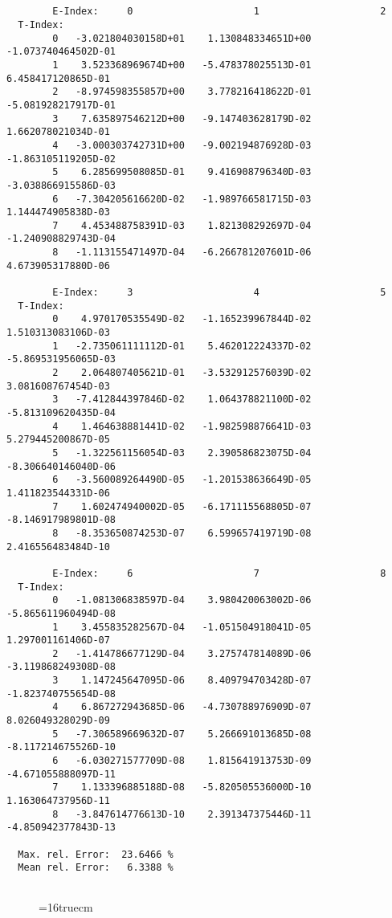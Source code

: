 \documentclass[12pt]{article}
\begin{document}
\begin{small}\begin{verbatim}


        E-Index:     0                     1                     2
  T-Index:
        0   -3.021804030158D+01    1.130848334651D+00   -1.073740464502D-01
        1    3.523368969674D+00   -5.478378025513D-01    6.458417120865D-01
        2   -8.974598355857D+00    3.778216418622D-01   -5.081928217917D-01
        3    7.635897546212D+00   -9.147403628179D-02    1.662078021034D-01
        4   -3.000303742731D+00   -9.002194876928D-03   -1.863105119205D-02
        5    6.285699508085D-01    9.416908796340D-03   -3.038866915586D-03
        6   -7.304205616620D-02   -1.989766581715D-03    1.144474905838D-03
        7    4.453488758391D-03    1.821308292697D-04   -1.240908829743D-04
        8   -1.113155471497D-04   -6.266781207601D-06    4.673905317880D-06

        E-Index:     3                     4                     5
  T-Index:
        0    4.970170535549D-02   -1.165239967844D-02    1.510313083106D-03
        1   -2.735061111112D-01    5.462012224337D-02   -5.869531956065D-03
        2    2.064807405621D-01   -3.532912576039D-02    3.081608767454D-03
        3   -7.412844397846D-02    1.064378821100D-02   -5.813109620435D-04
        4    1.464638881441D-02   -1.982598876641D-03    5.279445200867D-05
        5   -1.322561156054D-03    2.390586823075D-04   -8.306640146040D-06
        6   -3.560089264490D-05   -1.201538636649D-05    1.411823544331D-06
        7    1.602474940002D-05   -6.171115568805D-07   -8.146917989801D-08
        8   -8.353650874253D-07    6.599657419719D-08    2.416556483484D-10

        E-Index:     6                     7                     8
  T-Index:
        0   -1.081306838597D-04    3.980420063002D-06   -5.865611960494D-08
        1    3.455835282567D-04   -1.051504918041D-05    1.297001161406D-07
        2   -1.414786677129D-04    3.275747814089D-06   -3.119868249308D-08
        3    1.147245647095D-06    8.409794703428D-07   -1.823740755654D-08
        4    6.867272943685D-06   -4.730788976909D-07    8.026049328029D-09
        5   -7.306589669632D-07    5.266691013685D-08   -8.117214675526D-10
        6   -6.030271577709D-08    1.815641913753D-09   -4.671055888097D-11
        7    1.133396885188D-08   -5.820505536000D-10    1.163064737956D-11
        8   -3.847614776613D-10    2.391347375446D-11   -4.850942377843D-13

  Max. rel. Error:  23.6466 %
  Mean rel. Error:   6.3388 %


\end{verbatim}\end{small}
\begin{figure} \label{2.3.2b}
\epsfxsize=16truecm
\end{figure}
\newpage
\end{document}
